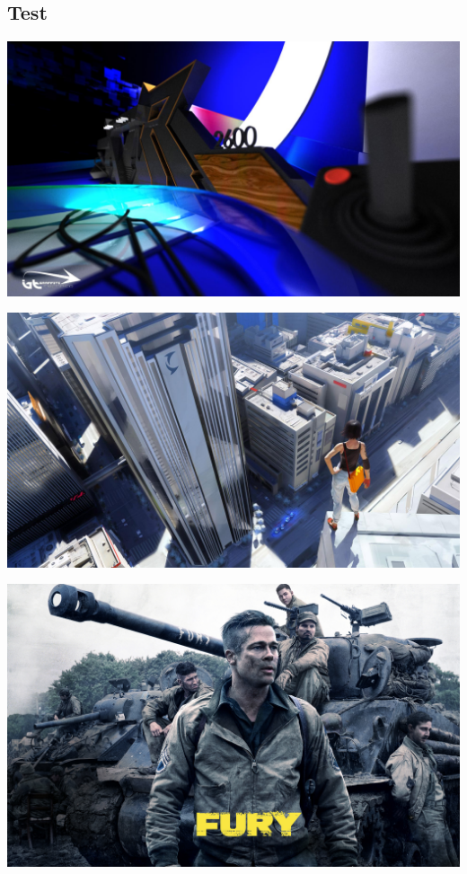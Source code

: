 \subsection{Test}

\includegraphics[width=\textwidth]{figures/6.jpg}


\includegraphics[angle=270,width=\textwidth]{figures/7.jpg}


\includegraphics[width=\textwidth]{figures/8.jpg}


